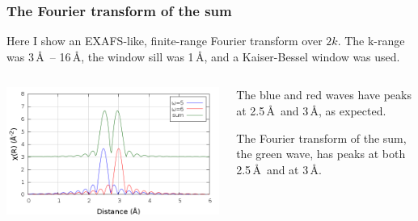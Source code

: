 \documentclass[10pt, xcolor=x11names, compress]{beamer}
\begin{document}
\begin{frame}
  \frametitle{The Fourier transform of the sum}
  Here I show an EXAFS-like, finite-range Fourier transform over $2k$.
  The k-range was 3\,\AA\ -- 16\,\AA, the window sill was 1\,\AA, and
  a Kaiser-Bessel window was used.

  \bigskip

  \begin{columns}
    \begin{column}{0.5\linewidth}
      \includegraphics[width=\linewidth]{beat_r.png}
    \end{column}
    \begin{column}{0.5\linewidth}
      The {\color{Blue2}blue} and {\color{Red2}red} waves have peaks
      at 2.5\,\AA\ and 3\,\AA, as expected.

      \medskip
      
      The Fourier transform of the sum, the {\color{Green4}green}
      wave, has peaks at both 2.5\,\AA\ and at 3\,\AA.
    \end{column}
  \end{columns}
\end{frame}
\end{document}
